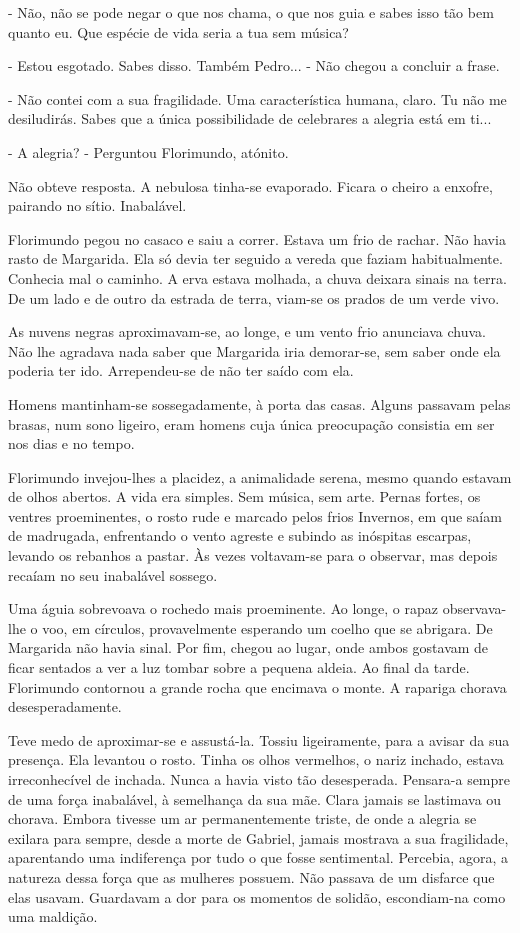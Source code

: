- Não, não se pode negar o que nos chama, o que nos guia e sabes isso
tão bem quanto eu. Que espécie de vida seria a tua sem música?

- Estou esgotado. Sabes disso. Também Pedro... - Não chegou a concluir a
frase.

- Não contei com a sua fragilidade. Uma característica humana, claro. Tu
não me desiludirás. Sabes que a única possibilidade de celebrares a
alegria está em ti...

- A alegria? - Perguntou Florimundo, atónito.

Não obteve resposta. A nebulosa tinha-se evaporado. Ficara o cheiro a
enxofre, pairando no sítio. Inabalável.

Florimundo pegou no casaco e saiu a correr. Estava um frio de rachar.
Não havia rasto de Margarida. Ela só devia ter seguido a vereda que
faziam habitualmente. Conhecia mal o caminho. A erva estava molhada, a
chuva deixara sinais na terra. De um lado e de outro da estrada de
terra, viam-se os prados de um verde vivo.

As nuvens negras aproximavam-se, ao longe, e um vento frio anunciava
chuva. Não lhe agradava nada saber que Margarida iria demorar-se, sem
saber onde ela poderia ter ido. Arrependeu-se de não ter saído com ela.

Homens mantinham-se sossegadamente, à porta das casas. Alguns passavam
pelas brasas, num sono ligeiro, eram homens cuja única preocupação
consistia em ser nos dias e no tempo.

Florimundo invejou-lhes a placidez, a animalidade serena, mesmo quando
estavam de olhos abertos. A vida era simples. Sem música, sem arte.
Pernas fortes, os ventres proeminentes, o rosto rude e marcado pelos
frios Invernos, em que saíam de madrugada, enfrentando o vento agreste e
subindo as inóspitas escarpas, levando os rebanhos a pastar. Às vezes
voltavam-se para o observar, mas depois recaíam no seu inabalável
sossego.

Uma águia sobrevoava o rochedo mais proeminente. Ao longe, o rapaz
observava-lhe o voo, em círculos, provavelmente esperando um coelho que
se abrigara. De Margarida não havia sinal. Por fim, chegou ao lugar,
onde ambos gostavam de ficar sentados a ver a luz tombar sobre a pequena
aldeia. Ao final da tarde. Florimundo contornou a grande rocha que
encimava o monte. A rapariga chorava desesperadamente.

Teve medo de aproximar-se e assustá-la. Tossiu ligeiramente, para a
avisar da sua presença. Ela levantou o rosto. Tinha os olhos vermelhos,
o nariz inchado, estava irreconhecível de inchada. Nunca a havia visto
tão desesperada. Pensara-a sempre de uma força inabalável, à semelhança
da sua mãe. Clara jamais se lastimava ou chorava. Embora tivesse um ar
permanentemente triste, de onde a alegria se exilara para sempre, desde
a morte de Gabriel, jamais mostrava a sua fragilidade, aparentando uma
indiferença por tudo o que fosse sentimental. Percebia, agora, a
natureza dessa força que as mulheres possuem. Não passava de um disfarce
que elas usavam. Guardavam a dor para os momentos de solidão,
escondiam-na como uma maldição.

